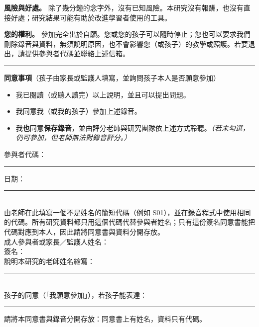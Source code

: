 \documentclass[11pt,a4paper]{article}
\begin{document}
\textbf{風險與好處。} 除了幾分鐘的念字外，沒有已知風險。本研究沒有報酬，也沒有直接好處；研究結果可能有助於改進學習者使用的工具。

\textbf{您的權利。} 參加完全出於自願。您或您的孩子可以隨時停止；您也可以要求我們刪除錄音與資料，無須說明原因，也不會影響您（或孩子）的教學或照護。若要退出，請提供參與者代碼並聯絡上述信箱。

\medskip\hrule\medskip
\textbf{同意事項}（孩子由家長或監護人填寫，並詢問孩子本人是否願意參加）

\begin{itemize}[label=$\square$]
\item 我已閱讀（或聽人讀完）以上說明，並且可以提出問題。
\item 我同意我（或我的孩子）參加上述錄音。
\item 我\textbf{也}同意\textbf{保存錄音}，並由評分老師與研究團隊依上述方式聆聽。\textit{（若未勾選，仍可參加，但老師無法對錄音評分。）}
\end{itemize}

\vspace{6pt}
\noindent 參與者代碼：\rule{3.5cm}{0.4pt}\hfill 日期：\rule{4cm}{0.4pt}\\[2pt]
{\footnotesize\noindent 由老師在此填寫一個不是姓名的簡短代碼（例如 S01），並在錄音程式中使用相同的代碼。所有研究資料都只用這個代碼代替參與者姓名；只有這份簽名同意書能把代碼對應到本人，因此請將同意書與資料分開存放。}\\[12pt]
\noindent 成人參與者或家長／監護人姓名：\hrulefill\\[12pt]
\noindent 簽名：\hrulefill\\[12pt]
\noindent 說明本研究的老師姓名縮寫：\rule{3cm}{0.4pt}\\[12pt]
\noindent 孩子的同意（「我願意參加」），若孩子能表達：\rule{4cm}{0.4pt}

\vspace{4pt}\footnotesize 請將本同意書與錄音分開存放：同意書上有姓名，資料只有代碼。
\end{document}
